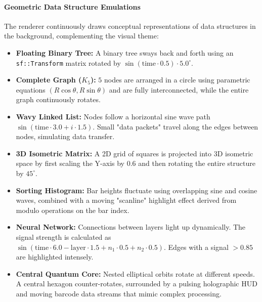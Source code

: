 \paragraph{Geometric Data Structure Emulations} 
The renderer continuously draws conceptual representations of data structures in the background, complementing the visual theme: 
\begin{itemize} 
    \item \textbf{Floating Binary Tree:} A binary tree sways back and forth using an \texttt{sf::Transform} matrix rotated by $\sin(\text{time} \cdot 0.5) \cdot 5.0^\circ$. 
    \item \textbf{Complete Graph ($K_5$):} $5$ nodes are arranged in a circle using parametric equations $(R\cos\theta, R\sin\theta)$ and are fully interconnected, while the entire graph continuously rotates. 
    \item \textbf{Wavy Linked List:} Nodes follow a horizontal sine wave path $\sin(\text{time} \cdot 3.0 + i \cdot 1.5)$. Small "data packets" travel along the edges between nodes, simulating data transfer. 
    \item \textbf{3D Isometric Matrix:} A 2D grid of squares is projected into 3D isometric space by first scaling the Y-axis by $0.6$ and then rotating the entire structure by $45^\circ$. 
    \item \textbf{Sorting Histogram:} Bar heights fluctuate using overlapping sine and cosine waves, combined with a moving "scanline" highlight effect derived from modulo operations on the bar index. 
    \item \textbf{Neural Network:} Connections between layers light up dynamically. The signal strength is calculated as $\sin(\text{time} \cdot 6.0 - \text{layer} \cdot 1.5 + n_1 \cdot 0.5 + n_2 \cdot 0.5)$. Edges with a signal $> 0.85$ are highlighted intensely. 
    \item \textbf{Central Quantum Core:} Nested elliptical orbits rotate at different speeds. A central hexagon counter-rotates, surrounded by a pulsing holographic HUD and moving barcode data streams that mimic complex processing. 
\end{itemize}
